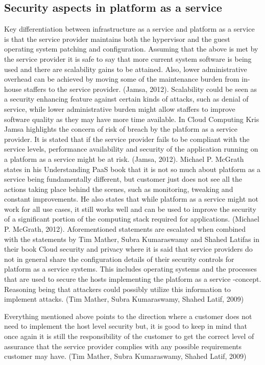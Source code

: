 \documentclass{article}
\begin{document}
\subsection{Security aspects in platform as a service}
Key differentiation between infrastructure as a service and platform as a service is that the service provider maintains both the hypervisor and the guest operating system patching and configuration.
Assuming that the above is met by the service provider it is safe to say that more current system software is being used and there are scalability gains to be attained. Also, lower administrative overhead can be achieved by moving some of the maintenance burden from in-house staffers to the service provider. (Jamsa, 2012). Scalability could be seen as a security enhancing feature against certain kinds of attacks, such as denial of service, while lower administrative burden might allow staffers to improve software quality as they may have more time available.
In Cloud Computing Kris Jamsa highlights the concern of risk of breach by the platform as a service provider. It is stated that if the service provider fails to be compliant with the service levels, performance availability and security of the application running on a platform as a service might be at risk. (Jamsa, 2012).
Michael P. McGrath states in his Understanding PaaS book that it is not so much about platform as a service being fundamentally different, but customer just does not see all the actions taking place behind the scenes, such as monitoring, tweaking and constant improvements. He also states that while platform as a service might not work for all use cases, it still works well and can be used to improve the security of a significant portion of the computing stack required for applications. (Michael P. McGrath, 2012).
Aforementioned statements are escalated when combined with the statements by Tim Mather, Subra Kumaraswamy and Shahed Latifas in their book Cloud security and privacy where it is said that service providers do not in general share the configuration details of their security controls for platform as a service systems. This includes operating systems and the processes that are used to secure the hosts implementing the platform as a service -concept. Reasoning being that attackers could possibly utilize this information to implement attacks. (Tim Mather, Subra Kumaraswamy, Shahed Latif, 2009)
\par
Everything mentioned above points to the direction where a customer does not need to implement the host level security but, it is good to keep in mind that once again it is still the responsibility of the customer to get the correct level of assurance that the service provider complies with any possible requirements customer may have. (Tim Mather, Subra Kumaraswamy, Shahed Latif, 2009)
\end{document}
